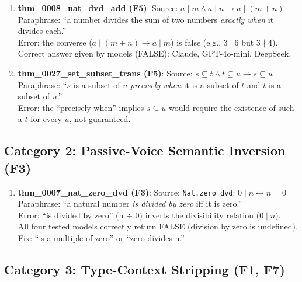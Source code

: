 \documentclass{article}
\begin{document}
\begin{enumerate}
\item \textbf{thm\_0008\_nat\_dvd\_add (F5)}: Source: $a \mid m \wedge a \mid n \to a \mid (m+n)$ \\
Paraphrase: ``a number divides the sum of two numbers \emph{exactly when} it divides each.'' \\
Error: the converse ($a \mid (m+n) \to a \mid m$) is false (e.g., $3 \mid 6$ but $3 \nmid 4$). \\
Correct answer given by models (FALSE): Claude, GPT-4o-mini, DeepSeek.

\item \textbf{thm\_0027\_set\_subset\_trans (F5)}: Source: $s \subseteq t \wedge t \subseteq u \to s \subseteq u$ \\
Paraphrase: ``$s$ is a subset of $u$ \emph{precisely when} it is a subset of $t$ and $t$ is a subset of $u$.'' \\
Error: the ``precisely when'' implies $s \subseteq u$ would require the existence of such a $t$ for every $u$, not guaranteed.
\end{enumerate}

\subsection*{Category 2: Passive-Voice Semantic Inversion (F3)}

\begin{enumerate}
\item \textbf{thm\_0007\_nat\_zero\_dvd (F3)}: Source: \texttt{Nat.zero\_dvd}: $0 \mid n \leftrightarrow n = 0$ \\
Paraphrase: ``a natural number \emph{is divided by zero} iff it is zero.'' \\
Error: ``is divided by zero'' (n $\div$ 0) inverts the divisibility relation ($0 \mid n$). \\
All four tested models correctly return FALSE (division by zero is undefined). \\
Fix: ``is a multiple of zero'' or ``zero divides n.''
\end{enumerate}

\subsection*{Category 3: Type-Context Stripping (F1, F7)}
\end{document}
